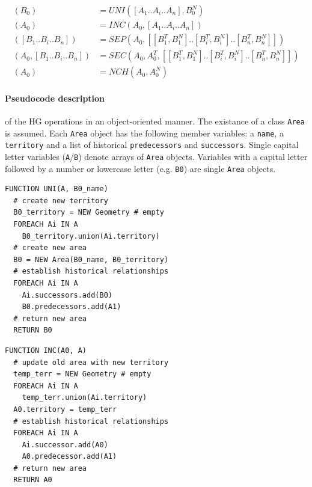 \vspace{-2.5em}
\begin{align*}
  (B_0)                       &= UNI([A_1 .. A_i .. A_n], B_0^N) \\
  (A_0)                       &= INC(A_0, [A_1 .. A_i .. A_n]) \\
  ([B_1 .. B_i .. B_n])       &= SEP(A_0, [[B_1^T, B_1^N] .. [B_i^T, B_i^N] .. [B_n^T, B_n^N]]) \\
  (A_0, [B_1 .. B_i .. B_n])  &= SEC(A_0, A_0^T, [[B_1^T, B_1^N] .. [B_i^T, B_i^N] .. [B_n^T, B_n^N]]) \\
  (A_0)                       &= NCH(A_0, A_0^N)
\end{align*}


\paragraph{Pseudocode description} %
\label{par:pseudocode_description}

of the HG operations in an object-oriented manner. The existance of a class \texttt{Area} is assumed. Each \texttt{Area} object has the following member variables: a \texttt{name}, a \texttt{territory} and a list of historical \texttt{predecessors} and \texttt{successors}. Single capital letter variables (\texttt{A}/\texttt{B}) denote arrays of \texttt{Area} objects. Variables with a capital letter followed by a number or lowercase letter (e.g. \texttt{B0}) are single \texttt{Area} objects.

\begin{minipage}[t]{0.47\textwidth}
\begin{lstlisting}[language=pseudocode,
  caption=Unification]
FUNCTION UNI(A, B0_name)
  # create new territory
  B0_territory = NEW Geometry # empty
  FOREACH Ai IN A
    B0_territory.union(Ai.territory)
  # create new area
  B0 = NEW Area(B0_name, B0_territory)
  # establish historical relationships
  FOREACH Ai IN A
    Ai.successors.add(B0)
    B0.predecessors.add(A1)
  # return new area
  RETURN B0
\end{lstlisting}
\end{minipage}    %
\hspace{3.0em}    %
\begin{minipage}[t]{0.47\textwidth}
\begin{lstlisting}[language=pseudocode,
  caption=Incorporation]
FUNCTION INC(A0, A)
  # update old area with new territory
  temp_terr = NEW Geometry # empty
  FOREACH Ai IN A
    temp_terr.union(Ai.territory)
  A0.territory = temp_terr
  # establish historical relationships
  FOREACH Ai IN A
    Ai.successor.add(A0)
    A0.predecessor.add(A1)
  # return new area
  RETURN A0
\end{lstlisting}
\end{minipage}

